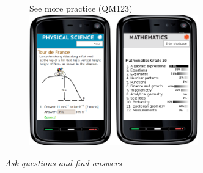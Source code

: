 {\begin{figure}[H]
\begin{center}
See more practice  (QM123)\\ 
\includegraphics[width=0.65\textwidth]{../title_images/practicephones.png}
\end{center}
\end{figure}
\par



\vspace*{1cm}
}

{\normalfont\sffamily\fontsize{22}\normalfont\itshape Ask questions and find answers} \par


